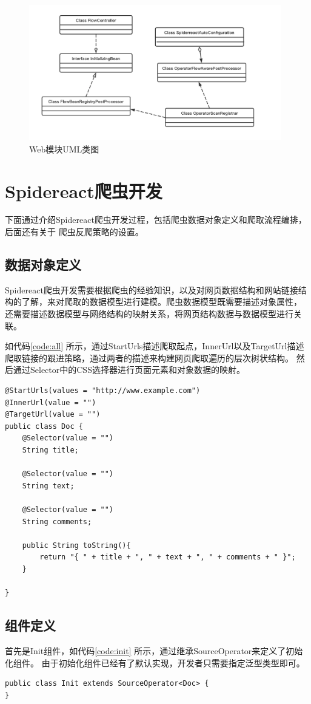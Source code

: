 \documentclass[master]{njuthesis}
\begin{document}
\begin{figure}
\centering
\includegraphics[width=0.98\textwidth]{pic/webuml.png}
\caption{Web模块UML类图}\label{fig:webuml}
\end{figure}

\section{Spidereact爬虫开发}
下面通过介绍Spidereact爬虫开发过程，包括爬虫数据对象定义和爬取流程编排，后面还有关于
爬虫反爬策略的设置。
\subsection{数据对象定义}
Spidereact爬虫开发需要根据爬虫的经验知识，以及对网页数据结构和网站链接结构的了解，来对爬取的数据模型进行建模。爬虫数据模型既需要描述对象属性，
还需要描述数据模型与网络结构的映射关系，将网页结构数据与数据模型进行关联。

如代码\ref{code:all} 所示，通过StartUrls描述爬取起点，InnerUrl以及TargetUrl描述爬取链接的跟进策略，通过两者的描述来构建网页爬取遍历的层次树状结构。
然后通过Selector中的CSS选择器进行页面元素和对象数据的映射。
\begin{lstlisting}[label = code:all, caption = {数据模型定义}]
@StartUrls(values = "http://www.example.com")
@InnerUrl(value = "")
@TargetUrl(value = "")
public class Doc {
    @Selector(value = "")
    String title;

    @Selector(value = "")
    String text;

    @Selector(value = "")
    String comments;

    public String toString(){
        return "{ " + title + ", " + text + ", " + comments + " }";
    }

}
\end{lstlisting}

\subsection{组件定义}
首先是Init组件，如代码\ref{code:init} 所示，通过继承SourceOperator来定义了初始化组件。
由于初始化组件已经有了默认实现，开发者只需要指定泛型类型即可。
\begin{lstlisting}[label = code:init, caption = {Init组件定义}]
public class Init extends SourceOperator<Doc> {
}
\end{lstlisting}
\end{document}
